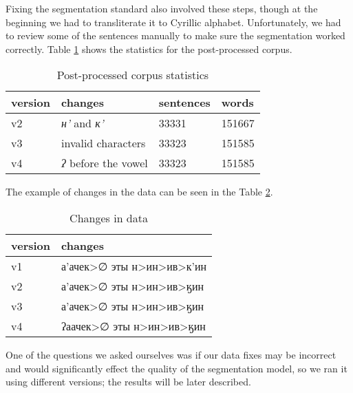 \documentclass[leqno]{article}
\begin{document}
Fixing the segmentation standard also involved these steps, though at the beginning we had to transliterate it to Cyrillic alphabet. Unfortunately, we had to review some of the sentences manually to make sure the segmentation worked correctly. Table \ref{tab:postproc} shows the statistics for the post-processed corpus.
\begin{table}[h]
\centering
\begin{tabular}{|l|l|l|l|}
\hline
{\color[HTML]{000000} version} & {\color[HTML]{000000} changes}              & {\color[HTML]{000000} sentences} & {\color[HTML]{000000} words}  \\ \hline
{\color[HTML]{000000} v2}      & {\color[HTML]{000000} \textit{н'} and \textit{к'}}          & {\color[HTML]{000000} 33331}     & {\color[HTML]{000000} 151667} \\ \hline
{\color[HTML]{000000} v3}      & {\color[HTML]{000000} invalid characters}   & {\color[HTML]{000000} 33323}     & {\color[HTML]{000000} 151585} \\ \hline
{\color[HTML]{000000} v4}      & {\color[HTML]{000000} \textit{ʔ} before the vowel} & {\color[HTML]{000000} 33323}     & {\color[HTML]{000000} 151585} \\ \hline
\end{tabular}
\caption{Post-processed corpus statistics}
\label{tab:postproc}
\end{table}

The example of changes in the data can be seen in the Table \ref{tab:datachanges}.

\begin{table}[h]
\centering
\begin{tabular}{|l|l|}
\hline
{\color[HTML]{000000} version} & {\color[HTML]{000000} changes}       \\ \hline
{\color[HTML]{000000} v1}      & {\color[HTML]{000000} а'ачек>∅ эты н>ин>ив>к'ин} \\ \hline
{\color[HTML]{000000} v2}      & {\color[HTML]{000000} а'ачек>∅ эты н>ин>ив>ӄин} \\ \hline
{\color[HTML]{000000} v3}      & {\color[HTML]{000000} а'ачек>∅ эты н>ин>ив>ӄин} \\ \hline
{\color[HTML]{000000} v4}      & {\color[HTML]{000000} ʔаачек>∅ эты н>ин>ив>ӄин} \\ \hline
\end{tabular}
\caption{Changes in data}
\label{tab:datachanges}
\end{table}

One of the questions we asked ourselves was if our data fixes may be incorrect and would significantly effect the quality of the segmentation model, so we ran it using different versions; the results will be later described.
\end{document}
